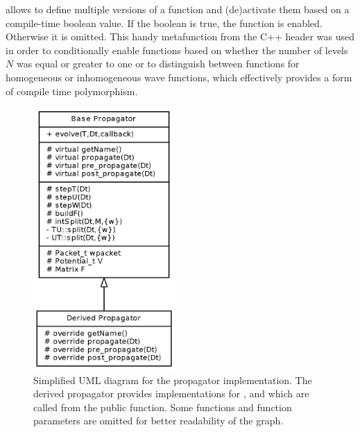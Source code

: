  allows to define multiple versions of a function and (de)activate them based on a compile-time boolean value.
If the boolean is true, the function is enabled. Otherwise it is omitted.
This handy metafunction from the C++  header was used in order to conditionally enable functions based on whether the number of levels $N$ was equal or greater to one or to distinguish between functions for homogeneous or inhomogeneous wave functions, which effectively provides a form of compile time polymorphism.
%
\begin{figure}[ht]
	\centering
	\includegraphics[height=10cm]{figures/uml.png}
	\caption{Simplified UML diagram for the propagator implementation.
		The derived propagator provides implementations for ,  and  which are called from the public  function.
		Some functions and function parameters are omitted for better readability of the graph.}
	\label{fig:uml}
\end{figure}



